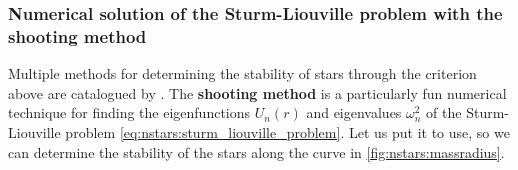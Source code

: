 
\subsubsection{Numerical solution of the Sturm-Liouville problem with the shooting method}

Multiple methods for determining the stability of stars through the criterion above are catalogued by \cite{ref:stability_methods}.
The \textbf{shooting method} is a particularly fun numerical technique for finding the eigenfunctions $U_n(r)$ and eigenvalues $\omega_n^2$ of the Sturm-Liouville problem \eqref{eq:nstars:sturm_liouville_problem}.
Let us put it to use, so we can determine the stability of the stars along the curve in \cref{fig:nstars:massradius}.


